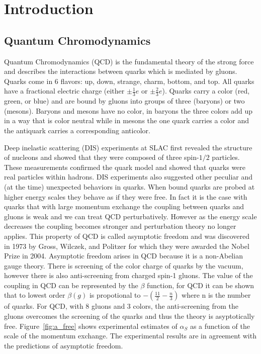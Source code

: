\chapter{Introduction}

\section{Quantum Chromodynamics}

Quantum Chromodynamics (QCD) is the fundamental theory of the strong force and describes the interactions between quarks which is mediated by gluons. Quarks come in 6 flavors: up, down, strange, charm, bottom, and top. All quarks have a fractional electric charge (either $\pm \frac{1}{3}e$ or $\pm \frac{2}{3}e$). Quarks carry a color (red, green, or blue) and are bound by gluons into groups of three (baryons) or two (mesons). Baryons and mesons have no color, in baryons the three colors add up in a way that is color neutral while in mesons the one quark carries a color and the antiquark carries a corresponding anticolor. 

Deep inelastic scattering (DIS) experiments at SLAC first revealed the structure of nucleons and showed that they were composed of three spin-$1/2$ particles. These measurements confirmed the quark model and showed that quarks were real particles within hadrons. DIS experiments also suggested other peculiar and (at the time) unexpected behaviors in quarks. When bound quarks are probed at higher energy scales they behave as if they were free. In fact it is the case with quarks that with large momentum exchange the coupling between quarks and gluons is weak and we can treat QCD perturbatively. However as the energy scale decreases the coupling becomes stronger and perturbation theory no longer applies. This property of QCD is called asymptotic freedom and was discovered in 1973 by Gross, Wilczek, and Politzer for which they were awarded the Nobel Prize in 2004. Asymptotic freedom arises in QCD because it is a non-Abelian gauge theory. There is screening of the color charge of quarks by the vacuum, however there is also anti-screening from charged spin-1 gluons. The value of the coupling in QCD can be represented by the $\beta$ function, for QCD it can be shown that to lowest order $\beta(g)$ is propotional to $-(\frac{11}{2} - \frac{n}{3})$ where n is the number of quarks. For QCD, with 8 gluons and 3 colors, the anti-screening from the gluons overcomes the screening of the quarks and thus the theory is asyptotically free. Figure~\ref{fig:a_free} shows experimental estimates of $\alpha_S$ as a function of the scale of the momentum exchange. The experimental results are in agreement with the predictions of asymptotic freedom. 

